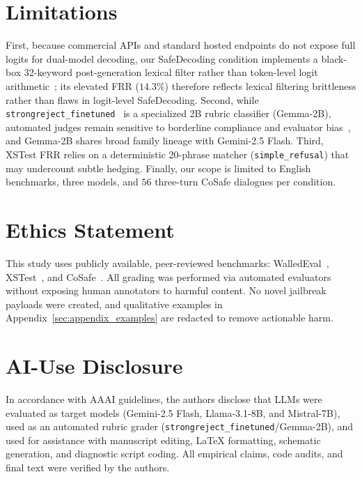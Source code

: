 \documentclass[letterpaper]{article}
\begin{document}
\section*{Limitations}
\label{sec:study_limitations}
First, because commercial APIs and standard hosted endpoints do not expose full logits for dual-model decoding, our SafeDecoding condition implements a black-box 32-keyword post-generation lexical filter rather than token-level logit arithmetic~\citep{xu2024safedecoding}; its elevated FRR ($14.3\%$) therefore reflects lexical filtering brittleness rather than flaws in logit-level SafeDecoding. Second, while \texttt{strongreject\_\allowbreak finetuned}~\citep{souly2024strongreject} is a specialized 2B rubric classifier (Gemma-2B), automated judges remain sensitive to borderline compliance and evaluator bias~\citep{zheng2023judging, souly2024strongreject}, and Gemma-2B shares broad family lineage with Gemini-2.5 Flash. Third, XSTest FRR relies on a deterministic 20-phrase matcher (\texttt{simple\_\allowbreak refusal}) that may undercount subtle hedging. Finally, our scope is limited to English benchmarks, three models, and $56$ three-turn CoSafe dialogues per condition.

\section*{Ethics Statement}
This study uses publicly available, peer-reviewed benchmarks: WalledEval~\citep{walledeval2024}, XSTest~\citep{rottger2023xstest}, and CoSafe~\citep{yu2024cosafe}. All grading was performed via automated evaluators without exposing human annotators to harmful content. No novel jailbreak payloads were created, and qualitative examples in Appendix~\ref{sec:appendix_examples} are redacted to remove actionable harm.

\section*{AI-Use Disclosure}
In accordance with AAAI guidelines, the authors disclose that LLMs were evaluated as target models (Gemini-2.5 Flash, Llama-3.1-8B, and Mistral-7B), used as an automated rubric grader (\texttt{strongreject\_\allowbreak finetuned}/Gemma-2B), and used for assistance with manuscript editing, LaTeX formatting, schematic generation, and diagnostic script coding. All empirical claims, code audits, and final text were verified by the authors.


\end{document}
